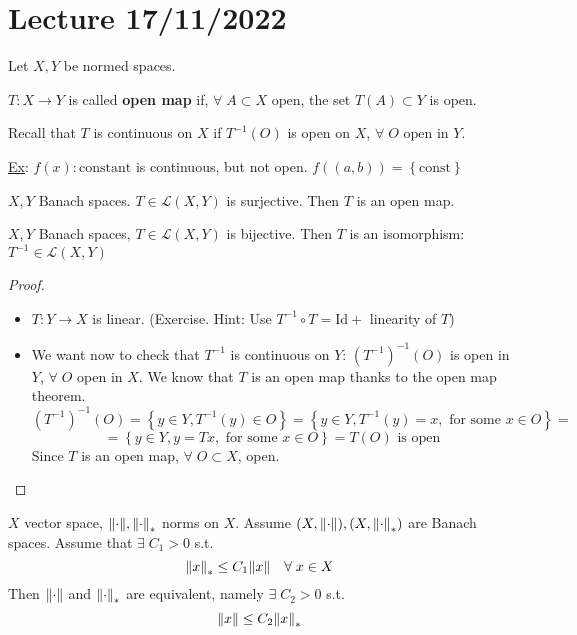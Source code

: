 \section{Lecture 17/11/2022}
Let \(X, Y\) be normed spaces.
\begin{definition}
    \(T: X \to Y\) is called \textbf{open map} if, \(\forall \; A \subset X \mbox{ open}\), the set \(T(A)\subset Y\) is open.
\end{definition}
\begin{remark}
    Recall that \(T\) is continuous on \(X\) if \(T^{-1}(O)\) is open on \(X\), \(\forall \; O \mbox{ open in } Y\).
\end{remark}
\underline{Ex}: \(f(x) : \mbox{constant}\) is continuous, but not open. \(f((a,b)) = \left\{ \mbox{const} \right\}\)
\begin{theorem}
    \(X, Y\) Banach spaces. \(T \in \mathcal{L}(X,Y)\) is surjective. Then \(T\) is an open map.
\end{theorem}
\begin{corollary}
    \(X,Y\) Banach spaces, \(T \in \mathcal{L}(X,Y)\) is bijective. Then \(T\) is an isomorphism: \(T^{-1} \in \mathcal{L}(X,Y)\)
\end{corollary}
\begin{proof}
    \begin{itemize}
        \item \(T : Y \to X\) is linear. (Exercise. Hint: Use \(T^{-1} \circ T = \text{Id} + \) linearity of \(T\))
        \item We want now to check that \(T^{-1}\) is continuous on \(Y\): \((T^{-1})^{-1}(O)\) is open in \(Y\), \(\forall \; O\) open in \(X\). We know that \(T\) is an open map thanks to the open map theorem.
        \[
            (T^{-1})^{-1}(O) = \left\{ y \in Y, T^{-1}(y) \in O \right\} = \left\{ y \in Y, T^{-1}(y) = x, \mbox{ for some } x \in O \right\} =
        \]
        \[
            = \left\{ y \in Y, y = Tx, \mbox{ for some } x \in O\right\} = T(O) \mbox{ is open}
        \]
    Since \(T\) is an open map, \(\forall \; O \subset X\), open.
    \end{itemize}
\end{proof}
\begin{corollary}
    \(X\) vector space, \(\norm{\cdot}, \norm{\cdot}_*\) norms on \(X\). Assume \((X, \norm{\cdot}), (X, \norm{\cdot}_*)\) are Banach spaces. 
    Assume that \(\exists \; C_1 > 0\) s.t. 
    \[
        \norm{x}_* \leq C_1\norm{x} \quad \forall \; x \in X
    \]
    Then \(\norm{\cdot}\) and \(\norm{\cdot}_*\) are equivalent, namely \(\exists \; C_2 > 0\) s.t. 
    \[
        \norm{x} \leq C_2 \norm{x}_*
    \]
\end{corollary}
